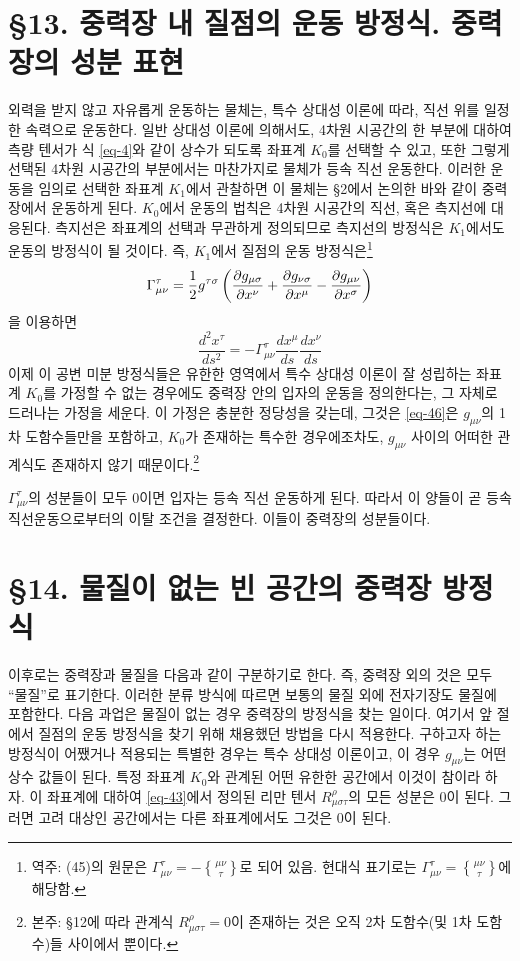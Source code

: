 \section*{\S 13. 중력장 내 질점의 운동 방정식. 중력장의 성분 표현}
외력을 받지 않고 자유롭게 운동하는 물체는, 특수 상대성 이론에 따라, 직선 위를 일정한 속력으로 운동한다. 일반 상대성 이론에 의해서도, 4차원 시공간의 한 부분에 대하여 측량 텐서가 식 \eqref{eq-4}와 같이 상수가 되도록 좌표계 $K_0$를 선택할 수 있고, 또한 그렇게 선택된 4차원 시공간의 부분에서는 마찬가지로 물체가 등속 직선 운동한다.
이러한 운동을 임의로 선택한 좌표계 $K_1$에서 관찰하면 이 물체는 \S 2에서 논의한 바와 같이 중력장에서 운동하게 된다. $K_0$에서 운동의 법칙은 4차원 시공간의 직선, 혹은 측지선에 대응된다. 측지선은 좌표계의 선택과 무관하게 정의되므로 측지선의 방정식은 $K_1$에서도 운동의 방정식이 될 것이다. 즉, $ K_1 $에서 질점의 운동 방정식은\footnote{역주: (45)의 원문은 $\Gamma_{\mu\nu}^{\tau}=-\genfrac\{\}{0pt}{1}{\mu\nu}{\tau}$로 되어 있음. 현대식 표기로는  $\Gamma_{\mu\nu}^{\tau}=\genfrac\{\}{0pt}{1}{\mu\nu}{\tau}$에 해당함.}
\begin{equation} \label{eq-45}
	\Gamma_{\mu\nu}^{\tau}=\frac{1}{2}g^{\tau\sigma}\left(
	{\frac{{\partial}{g_{\mu\sigma}}}{{\partial}{x^\nu}}}
	+ {\frac{{\partial}{g_{\nu\sigma}}}{{\partial}{x^\mu}}}
	- {\frac{{\partial}{g_{\mu\nu}}}{{\partial}{x^\sigma}}}
	\right)
\end{equation}
을 이용하면
\begin{equation} \label{eq-46}
	\frac{d^2 x^\tau}{ds^2}=-\Gamma_{\mu\nu}^{\tau}\frac{dx^\mu}{ds}\frac{dx^\nu}{ds}
\end{equation}
이제 이 공변 미분 방정식들은 유한한 영역에서 특수 상대성 이론이 잘 성립하는 좌표계 $ K_0 $를 가정할 수 없는 경우에도 중력장 안의 입자의 운동을 정의한다는,  그 자체로 드러나는 가정을 세운다. 이 가정은 충분한 정당성을 갖는데, 그것은 \eqref{eq-46}은 $g_{\mu\nu}$의 1차 도함수들만을 포함하고, $ K_0 $가 존재하는 특수한 경우에조차도, $g_{\mu\nu}$ 사이의 어떠한 관계식도 존재하지 않기 때문이다.\footnote{본주: \S 12에 따라 관계식 $R_{\mu\sigma\tau}^{\rho}=0$이 존재하는 것은 오직 2차 도함수(및 1차 도함수)들 사이에서 뿐이다.}

$\Gamma_{\mu\nu}^{\tau}$의 성분들이 모두 0이면 입자는 등속 직선 운동하게 된다. 따라서 이 양들이 곧 등속 직선운동으로부터의 이탈 조건을 결정한다. 이들이 중력장의 성분들이다.

\section*{\S 14. 물질이 없는 빈 공간의 중력장 방정식}
이후로는 중력장과 물질을 다음과 같이 구분하기로 한다. 즉, 중력장 외의 것은 모두 ``물질''로 표기한다. 이러한 분류 방식에 따르면 보통의 물질 외에 전자기장도 물질에 포함한다.
다음 과업은 물질이 없는 경우 중력장의 방정식을 찾는 일이다. 여기서 앞 절에서 질점의 운동 방정식을 찾기 위해 채용했던  방법을 다시 적용한다. 구하고자 하는 방정식이 어쨌거나 적용되는 특별한 경우는 특수 상대성 이론이고, 이 경우 $g_{\mu\nu}$는 어떤 상수 값들이 된다.
특정 좌표계 $K_0$와 관계된 어떤 유한한 공간에서 이것이 참이라 하자. 이 좌표계에 대하여 \eqref{eq-43}에서 정의된 리만 텐서 $R_{\mu\sigma\tau}^{\rho}$의 모든 성분은 0이 된다. 그러면 고려 대상인 공간에서는 다른 좌표계에서도 그것은 0이 된다.

